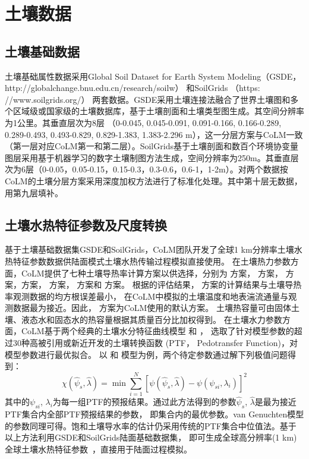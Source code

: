 \section{土壤数据}\label{土壤数据}
\subsection{土壤基础数据}\label{土壤基础数据}
土壤基础属性数据采用Global Soil Dataset for Earth System Modeling（GSDE，http://globalchange.bnu.edu.cn/research/soilw） \citep{shangguan2014global}
和SoilGrids （https:\\//www.soilgrids.org/）\citep{poggio2021soilgrids} 两套数据。GSDE采用土壤连接法融合了世界土壤图和多个区域级或国家级的土壤数据库，基于土壤剖面和土壤类型图生成。其空间分辨率为1公里。其垂直层次为8层 （0-0.045, 0.045-0.091, 0.091-0.166, 0.166-0.289, 0.289-0.493, 0.493-0.829, 0.829-1.383, 1.383-2.296 m），这一分层方案与CoLM一致（第一层对应CoLM第一和第二层）。SoilGrids基于土壤剖面和数百个环境协变量图层采用基于机器学习的数字土壤制图方法生成，空间分辨率为250m。其垂直层次为6层（0-0.05，0.05-0.15，0.15-0.3，0.3-0.6，0.6-1，1-2m）。对两个数据按CoLM的土壤分层方案采用深度加权方法进行了标准化处理。其中第十层无数据，用第九层填补。

\subsection{土壤水热特征参数及尺度转换}\label{土壤水热特征参数及尺度转换}

基于土壤基础数据集GSDE和SoilGrids，CoLM团队开发了全球1 km分辨率土壤水热特征参数数据供陆面模式土壤水热传输过程模拟直接使用。
在土壤热力参数方面，CoLM提供了七种土壤导热率计算方案以供选择，分别为 \citet{farouki1981thermal}方案，\citet{Johansen1975} 方案，
\citet{cote2005} 方案，\citet{balland2005}方案，\citet{lu2007improved} 方案，\citet{tarnawski2012series} 方案和 \citet{de1963thermal} 方案。
根据\citet{dai2019evaluation}的评估结果，\citet{balland2005} 方案的计算结果与土壤导热率观测数据的均方根误差最小，
在CoLM中模拟的土壤温度和地表湍流通量与观测数据最为接近。因此，\citet{balland2005} 方案为CoLM使用的默认方案。
土壤热容量可由固体土壤、液态水和固态水的热容量根据其质量百分比加权得到。
在土壤水力参数方面，CoLM基于两个经典的土壤水分特征曲线模型 \citet{campbell1974} 和 \citet{van1980closed}，
选取了针对模型参数的超过30种高被引用或新近开发的土壤转换函数 (PTF， Pedotransfer Function)，对模型参数进行最优拟合。
以\citet{balland2005} 和 \citet{campbell1974} 模型为例，两个待定参数通过解下列极值问题得到：
\begin{equation}
\chi\left(\hat{\psi}_{s}, \hat{\lambda}\right)=\min \sum_{i=1}^{N}\left[\psi\left(\hat{\psi}_{s}, \hat{\lambda}\right)-\psi\left(\psi_{s i}, \lambda_{i}\right)\right]^{2}
\end{equation}
%
其中的$\psi_{s i}$, $\lambda_{i}$为每一组PTF的预报结果。通过此方法得到的参数$\hat{\psi}_{s}$, $\hat{\lambda}$是最为接近PTF集合内全部PTF预报结果的参数，
即集合内的最优参数。van Genuchten模型的参数同理可得。饱和土壤导水率的估计仍采用传统的PTF集合中位值法。基于以上方法利用GSDE和SoilGrids陆面基础数据集，
即可生成全球高分辨率(1 km)全球土壤水热特征参数~\citep{dai2019evaluation}，直接用于陆面过程模拟。


